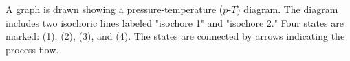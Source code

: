 A graph is drawn showing a pressure-temperature (\(p\)-\(T\)) diagram. The diagram includes two isochoric lines labeled "isochore 1" and "isochore 2." Four states are marked: (1), (2), (3), and (4). The states are connected by arrows indicating the process flow.